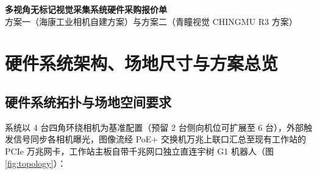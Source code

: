 \documentclass[10pt, a4paper]{ctexart}
\begin{document}
\begin{tcolorbox}[
  enhanced,
  colback=PrimaryNavy,
  colframe=PrimaryNavy,
  arc=3pt,
  boxrule=0pt,
  left=10pt, right=10pt, top=8pt, bottom=8pt
]
  \begin{center}
    {\LARGE\bfseries\color{white} 多视角无标记视觉采集系统硬件采购报价单}\\[3pt]
    {\normalsize\color{HeaderBg} 方案一（海康工业相机自建方案）与方案二（青瞳视觉 CHINGMU R3 方案）}
  \end{center}
\end{tcolorbox}

\section{硬件系统架构、场地尺寸与方案总览}

\subsection{硬件系统拓扑与场地空间要求}

系统以 4 台四角环绕相机为基准配置（预留 2 台侧向机位可扩展至 6 台），外部触发信号同步各相机曝光，图像流经 PoE+ 交换机万兆上联口汇总至现有工作站的 PCIe 万兆网卡，工作站主板自带千兆网口独立直连宇树 G1 机器人（图 \ref{fig:topology}）：
\end{document}

